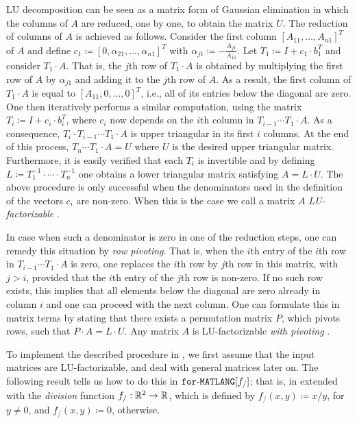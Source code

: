 LU decomposition  can be seen as a matrix form of Gaussian elimination in which the columns of $A$
are reduced, one by one, to obtain the matrix $U$. The reduction of columns of $A$ is achieved
as follows. Consider the first column $[A_{11},\ldots,A_{n1}]^T$ of $A$ and  define 
$c_1 \coloneqq   [0, \alpha_{21},\ldots, \alpha_{n1}]^T$ 
with $\alpha_{j1} \coloneqq   -\frac{A_{j1}}{A_{11}}$. Let $T_1\coloneqq  I+ c_1\cdot b_1^T$ and consider
$T_1\cdot A$. That is, the $j$th row of $T_1\cdot A$ is obtained by multiplying the first row of $A$ by $\alpha_{j1}$ and adding it to the $j$th row of $A$. As a result, the first column of $T_1\cdot A$ is equal to $[A_{11},0,\ldots,0]^T$, i.e., 
all of its entries below the diagonal are zero.  One then iteratively performs a similar computation, using the matrix $T_i\coloneqq  I+c_i\cdot b_i^T$, where $c_i$ now depends on the $i$th column in $T_{i-1}\cdots T_1\cdot A$. As a consequence, $T_i\cdot T_{i-1}\cdots T_1\cdot A$ is upper triangular
in its first $i$ columns. At the end of this process, $T_n\cdots T_1\cdot A=U$ where $U$ is the desired upper triangular matrix.
Furthermore, it is easily verified that each $T_i$ is invertible and by defining $L\coloneqq  T_1^{-1}\cdot\cdots\cdot T_n^{-1}$ one obtains a lower triangular matrix satisfying $A=L\cdot U$. The above procedure is only successful when the denominators used in the definition of the vectors $c_i$ are non-zero. When this is the case we call a matrix $A$ \textit{LU-factorizable} \cite{num}. 

In case when such a denominator is zero in one of the reduction steps, one can remedy this situation by \textit{row pivoting}. That is, when the $i$th entry of the
$i$th row in $T_{i-1}\cdots T_1\cdot A$ is zero, one replaces the $i$th row by  $j$th row in this matrix, with $j>i$, provided that the $i$th entry of the $j$th row is non-zero. If no such row exists, this implies that all elements below the diagonal are zero already in column $i$ and one can proceed with the next column. One can formulate this in matrix terms by stating that there exists a permutation matrix $P$, which pivots rows, such that $P\cdot A=L\cdot U$. Any matrix $A$ is LU-factorizable \textit{with pivoting} \cite{num}.

To implement the described procedure in \langfor, we first assume that the input matrices are LU-factorizable, and  deal with general matrices later on. The following result tells us how to do this in $\texttt{for}\text{-}\texttt{MATLANG}[f_/]$; that is, in \langfor extended with the \textit{division} function  $f_/:\mathbb{R}^2\to\mathbb{R}$, which is defined by $f_/(x,y)\coloneqq x/y$, for $y\neq 0$, and $f_/(x,y)\coloneqq   0$, otherwise. %

